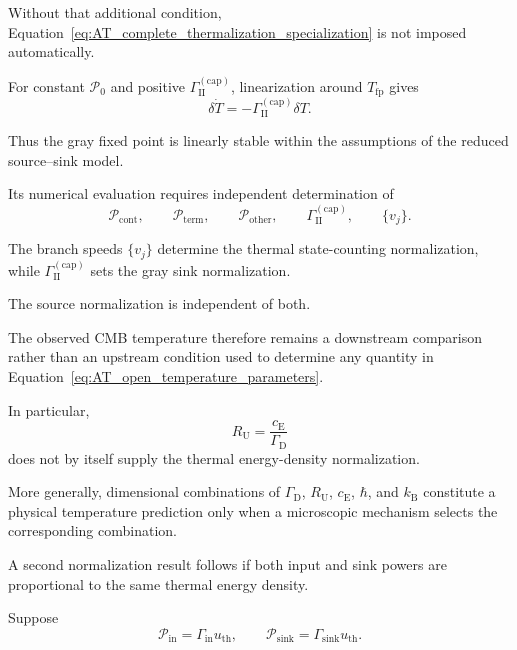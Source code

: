 Without that additional condition,
Equation~\eqref{eq:AT_complete_thermalization_specialization}
is not imposed automatically.

For constant
\(\mathcal P_0\)
and positive
\(\Gamma_{\mathrm{II}}^{(\mathrm{cap})}\),
linearization around
\(T_{\mathrm{fp}}\)
gives
\begin{equation}
    \delta\dot T
    =
    -
    \Gamma_{\mathrm{II}}^{(\mathrm{cap})}
    \delta T.
    \label{eq:AT_temperature_stability}
\end{equation}

Thus the gray fixed point is linearly stable within the assumptions of the
reduced source--sink model.

Its numerical evaluation requires independent determination of
\begin{equation}
    \mathcal P_{\mathrm{cont}},
    \qquad
    \mathcal P_{\mathrm{term}},
    \qquad
    \mathcal P_{\mathrm{other}},
    \qquad
    \Gamma_{\mathrm{II}}^{(\mathrm{cap})},
    \qquad
    \{v_j\}.
    \label{eq:AT_open_temperature_parameters}
\end{equation}

The branch speeds
\(\{v_j\}\)
determine the thermal state-counting normalization, while
\(\Gamma_{\mathrm{II}}^{(\mathrm{cap})}\)
sets the gray sink normalization.

The source normalization is independent of both.

The observed CMB temperature therefore remains a downstream comparison rather
than an upstream condition used to determine any quantity in
Equation~\eqref{eq:AT_open_temperature_parameters}.

In particular,
\begin{equation}
    R_{\mathrm U}
    =
    \frac{
        c_{\mathrm E}
    }{
        \Gamma_{\mathrm D}
    }
\end{equation}
does not by itself supply the thermal energy-density normalization.

More generally, dimensional combinations of
\(\Gamma_{\mathrm D}\),
\(R_{\mathrm U}\),
\(c_{\mathrm E}\),
\(\hbar\),
and
\(k_{\mathrm B}\)
constitute a physical temperature prediction only when a microscopic
mechanism selects the corresponding combination.

A second normalization result follows if both input and sink powers are
proportional to the same thermal energy density.

Suppose
\begin{equation}
    \mathcal P_{\mathrm{in}}
    =
    \Gamma_{\mathrm{in}}
    u_{\mathrm{th}},
    \qquad
    \mathcal P_{\mathrm{sink}}
    =
    \Gamma_{\mathrm{sink}}
    u_{\mathrm{th}}.
    \label{eq:AT_proportional_rates}
\end{equation}

